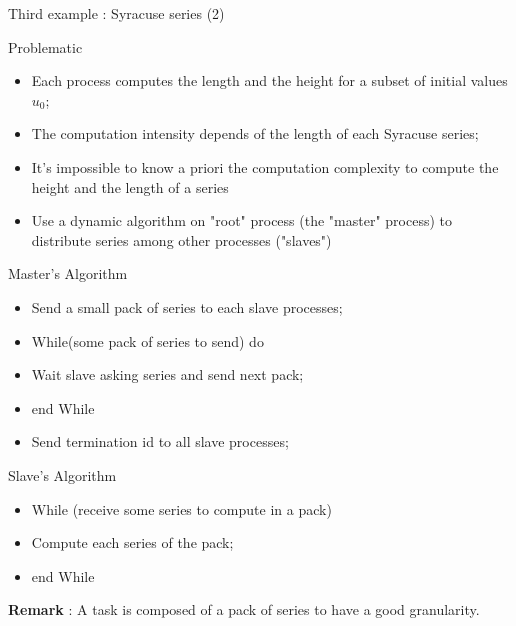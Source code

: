 \documentclass[compress,10pt,aspectratio=169]{beamer}
\begin{document}
\begin{frame}[fragile]{Third example : Syracuse series (2)}
    \scriptsize
    \begin{block}{\small Problematic}
        \begin{itemize}
            \item Each process computes the length and the height for a subset of initial values $u_{0}$;
            \item The computation intensity depends of the length of each Syracuse series;
            \item It's impossible to know a priori the computation complexity to compute the height and the length of a series
            \item Use a dynamic algorithm on "root" process (the "master" process) to distribute series among other processes ("slaves")
        \end{itemize}
    \end{block}

    \begin{multicols}{2}
        \begin{exampleblock}{\small Master's Algorithm}
            \begin{itemize}
                \item Send a small pack of series to each slave processes;
                \item While(some pack of series to send) do 
                \item \hspace*{2mm}Wait slave asking series and send next pack;
                \item end While
                \item Send termination id to all slave processes;
            \end{itemize}
        \end{exampleblock}
    

        \begin{exampleblock}{\small Slave's Algorithm}
            \begin{itemize}
                \item While (receive some series to compute in a pack)
                \item \hspace*{2mm}Compute each series of the pack;
                \item end While
            \end{itemize}
        \end{exampleblock}
    \end{multicols}

    \textbf{Remark} : A task is composed of a pack of series to have a good granularity.

\end{frame}
\end{document}
